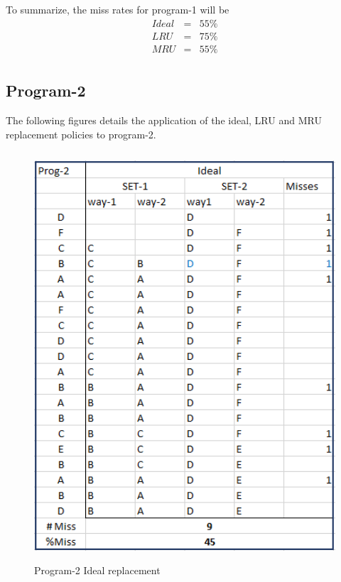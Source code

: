 \documentclass{tufte-handout}
\begin{document}
	To summarize, the miss rates for program-1 will be
	\begin{eqnarray*}
		Ideal &=& 55\% \\
		LRU &=& 75\% \\
		MRU &=& 55\% \\
	\end{eqnarray*}

\newpage
\newpage
	\subsection{Program-2}
	The following figures details the application of the ideal, LRU and MRU replacement policies to program-2.
	\begin{figure}[h!]
	\label{fig:p2ideal}
	\centering
	\includegraphics[width = 6in, height = 6in]{p2ideal}
	\caption{Program-2 Ideal replacement}
	\end{figure}
\end{document}
